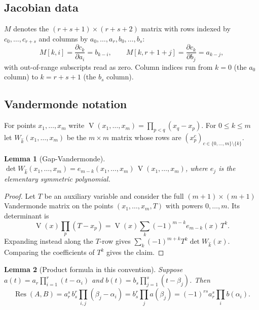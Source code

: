 \documentclass[11pt,reqno]{amsart}
\newtheorem{lemma}[lemma]{Lemma}
\theoremstyle{definition}
\theoremstyle{remark}
\newcommand{\Res}{\operatorname{Res}}
\newcommand{\Vand}{\operatorname{V}}
\begin{document}
\subsection{Jacobian data}
$M$ denotes the $(r+s+1)\times(r+s+2)$ matrix with rows indexed by
$c_0,\dots,c_{r+s}$ and columns by $a_0,\dots,a_r,b_0,\dots,b_s$:
\[
 M[k,i]=\frac{\partial c_k}{\partial a_i}=b_{k-i},
 \qquad
 M[k,r+1+j]=\frac{\partial c_k}{\partial b_j}=a_{k-j},
\]
with out-of-range subscripts read as zero.  Column indices run from
$k=0$ (the $a_0$ column) to $k=r+s+1$ (the $b_s$ column).

\subsection{Vandermonde notation}
For points $x_1,\dots,x_m$ write
$\Vand(x_1,\dots,x_m)=\prod_{p<q}(x_q-x_p)$.  For
$0\le k\le m$ let $W_{\hat k}(x_1,\dots,x_m)$ be the $m\times m$
matrix whose rows are
$(x_p^{c})_{c\in\{0,\dots,m\}\setminus\{k\}}$.

\begin{lemma}[Gap-Vandermonde]\label{lem:gap-vandermonde}
$\det W_{\hat k}(x_1,\dots,x_m)=e_{m-k}(x_1,\dots,x_m)\,
\Vand(x_1,\dots,x_m)$, where $e_j$ is the elementary symmetric
polynomial.
\end{lemma}

\begin{proof}
Let $T$ be an auxiliary variable and consider the full
$(m+1)\times(m+1)$ Vandermonde matrix on the points
$(x_1,\dots,x_m,T)$ with powers $0,\dots,m$.  Its determinant is
\[
 \Vand(x)\prod_p(T-x_p)
 =\Vand(x)\sum_k(-1)^{m-k}e_{m-k}(x)\,T^k .
\]
Expanding instead along the $T$-row gives
$\sum_k(-1)^{m+k}T^k\det W_{\hat k}(x)$.  Comparing the coefficients
of $T^k$ gives the claim.
\end{proof}

\begin{lemma}[Product formula in this convention]\label{lem:product}
Suppose $a(t)=a_r\prod_{i=1}^r(t-\alpha_i)$ and
$b(t)=b_s\prod_{j=1}^s(t-\beta_j)$.  Then
\[
 \Res(A,B)=a_r^s\,b_s^r\prod_{i,j}(\beta_j-\alpha_i)
 =b_s^r\prod_j a(\beta_j)
 =(-1)^{rs}a_r^s\prod_i b(\alpha_i).
\]
\end{lemma}
\end{document}
